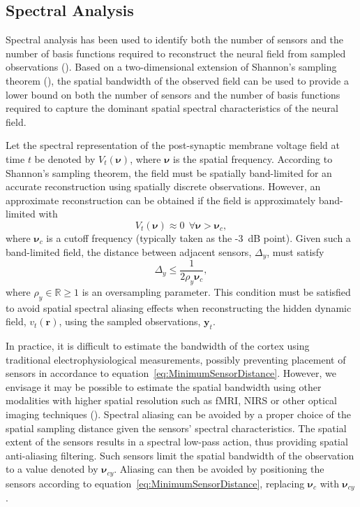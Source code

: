 \documentclass[5p,authoryear]{elsarticle}
\begin{document}
\subsection{Spectral Analysis}\label{SpectralAnalysisSection} 
Spectral analysis has been used to identify both the number of sensors and the number of basis functions required to reconstruct the neural field from sampled observations (\cite{Sanner1992,Scerri2009}). Based on a two-dimensional extension of Shannon's sampling theorem (\cite{Peterson1962}), the spatial bandwidth of the observed field can be used to provide a lower bound on both the number of sensors and the number of basis functions required to capture the dominant spatial spectral characteristics of the neural field.

Let the spectral representation of the post-synaptic membrane voltage field at time $t$ be denoted by $V_t(\boldsymbol{\nu})$, where $\boldsymbol\nu$ is the spatial frequency. According to Shannon's sampling theorem, the field must be spatially band-limited for an accurate reconstruction using spatially discrete observations. However, an approximate reconstruction can be obtained if the field is approximately band-limited with 
\begin{equation}
	V_t(\boldsymbol{\nu}) \approx 0 ~ \ \forall \boldsymbol{\nu} > \boldsymbol{\nu}_c,
\end{equation}
where $\boldsymbol{\nu}_c$ is a cutoff frequency (typically taken as the -3~dB point). Given such a band-limited field, the distance between adjacent sensors, $\Delta_y$, must satisfy 
\begin{equation}
	\label{eq:MinimumSensorDistance} \Delta_y \leq \frac{1}{2\rho_y\boldsymbol{\nu}_{c}}, 
\end{equation}
where $\rho_y \in \mathbb{R} \ge 1$ is an oversampling parameter. This condition must be satisfied to avoid spatial spectral aliasing effects when reconstructing the hidden dynamic field, $v_t(\mathbf{r})$, using the sampled observations, $\mathbf{y}_t$.

In practice, it is difficult to estimate the bandwidth of the cortex using traditional electrophysiological measurements, possibly preventing placement of sensors in accordance to equation~\ref{eq:MinimumSensorDistance}. However, we envisage it may be possible to estimate the spatial bandwidth using other modalities with higher spatial resolution such as fMRI, NIRS or other optical imaging techniques (\cite{Issa2000}). Spectral aliasing can be avoided by a proper choice of the spatial sampling distance given the sensors' spectral characteristics. The spatial extent of the sensors results in a spectral low-pass action, thus providing spatial anti-aliasing filtering. Such sensors limit the spatial bandwidth of the observation to a value denoted by $\boldsymbol{\nu}_{cy}$. Aliasing can then be avoided by positioning the sensors according to equation~\ref{eq:MinimumSensorDistance}, replacing $\boldsymbol{\nu}_c$ with $\boldsymbol{\nu}_{cy}$.
\end{document}
